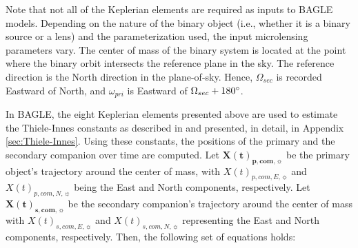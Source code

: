\documentclass[twocolumn]{aastex701}
\newcommand{\vect}[1]{\boldsymbol{#1}}
\newcommand{\Xcomp}{\vect{X(t)}_{\boldsymbol{p},\boldsymbol{com},\sun}}
\newcommand{\Xcoms}{\vect{X(t)}_{\boldsymbol{s},\boldsymbol{com},\sun}}
\newcommand{\Xcomep}{{X(t)}_{{p, {com}, E},\sun}}
\newcommand{\Xcomnp}{{X(t)}_{{p, {com}, N},\sun}}
\newcommand{\Xcomes}{{X(t)}_{{s, {com}, E},\sun}}
\newcommand{\Xcomns}{{X(t)}_{{s, {com}, N},\sun}}
\newcommand{\w}{\omega_{pri}}
\newcommand{\bigomega}{\Omega_{sec}}
\begin{document}
Note that not all of the Keplerian elements are required as inputs to BAGLE models. Depending on the nature of the binary object (i.e., whether it is a binary source or a lens) and the parameterization used, the input microlensing parameters vary. The center of mass of the binary system is located at the point where the binary orbit intersects the reference plane in the sky.
The reference direction is the North direction in the plane-of-sky. Hence, $\bigomega$ is recorded Eastward of North, and $\w$ is Eastward of $\bigomega + 180 \degree$. 

In BAGLE, the eight Keplerian elements presented above are used to estimate the Thiele-Innes constants as described in \citet{Koren_2016} and presented, in detail, in Appendix \ref{sec:Thiele-Innes}. Using these constants, the positions of the primary and the secondary companion over time are computed. Let  $\Xcomp$ be the primary object's trajectory around the center of mass, with $\Xcomep$ and  $\Xcomnp$ being the East and North components, respectively. Let  $\Xcoms$ be the secondary companion's trajectory around the center of mass with $\Xcomes$ and  $\Xcomns$ representing the East and North components, respectively. Then, the following set of equations holds: 







\end{document}
